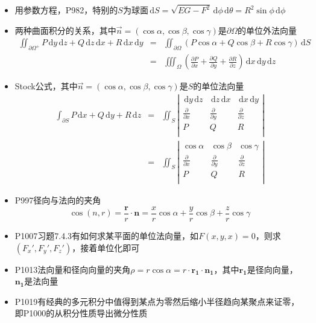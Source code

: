\documentclass[UTF8]{ctexart}
\newcommand{\ud}{\,\mathrm{d}}
\begin{document}
\begin{itemize}
\item 用参数方程，P982，特别的$S$为球面$\ud S=\sqrt{EG-F^2}\ud \phi\ud \theta = R^2\sin\phi \ud \phi $

\item 两种曲面积分的关系，其中$\vec{n} = (\cos \alpha,\cos\beta,\cos\gamma)$是$\partial\Omega$的单位外法向量
\begin{eqnarray*}
\iint_{\partial\Omega^+}P\ud y\ud z + Q\ud z\ud x+ R\ud x\ud y &=& \iint_{\partial\Omega}(P\cos \alpha + Q\cos \beta+ R\cos \gamma)\ud S \\
&=& \iiint_{\Omega}\left(\frac{\partial P}{\partial x}+\frac{\partial Q}{\partial y}+\frac{\partial R}{\partial z}\right)\ud x\ud y\ud z
\end{eqnarray*}

\item Stock公式，其中$\vec{n} = (\cos \alpha,\cos\beta,\cos\gamma)$是$S$的单位法向量
\begin{eqnarray*}
\int_{\partial S}P\ud x+Q\ud y+R\ud z&=&\iint_S\left|
\begin{array}{ccc}
\ud y\ud z&\ud z\ud x&\ud x\ud y\\
\frac{\partial}{\partial x}&\frac{\partial}{\partial y}&\frac{\partial}{\partial z}\\
P&Q&R\\
\end{array}
\right| \\
&=& \iint_S\left|
\begin{array}{ccc}
\cos \alpha&\cos\beta&\cos\gamma\\
\frac{\partial}{\partial x}&\frac{\partial}{\partial y}&\frac{\partial}{\partial z}\\
P&Q&R\\
\end{array}
\right|
\end{eqnarray*}

\item P997径向与法向的夹角
\[
\cos(n,r) = \frac{\mathbf{r}}{r}\cdot \mathbf{n} = \frac{x}{r}\cos \alpha +\frac{y}{r}\cos\beta +\frac{z}{r}\cos \gamma
\]

\item P1007习题7.4.3有如何求某平面的单位法向量，如$F(x,y,x)=0$，则求$(F_x',F_y',F_z')$，接着单位化即可

\item P1013法向量和径向向量的夹角$\rho = r \cos\alpha = r\cdot\mathbf{r_1}\cdot\mathbf{n_1}$，其中$\mathbf{r_1}$是径向向量，$\mathbf{n_1}$是法向量

\item P1019有经典的多元积分中值得到某点为零然后缩小半径趋向某聚点来证零，即P1000的从积分性质导出微分性质

\end{itemize}
\end{document}
